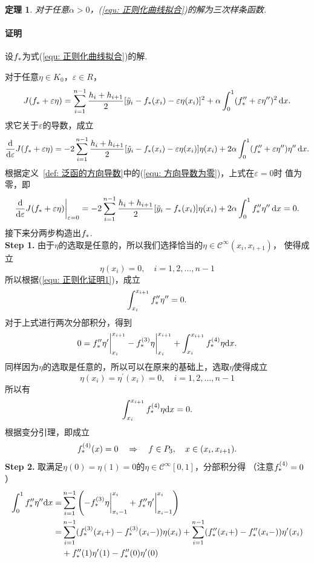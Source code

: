 \documentclass[12pt, a4paper]{article}
\theoremstyle{margin}
\newtheorem{thm}{定理}
\newcommand{\pr}{\prime}
\newcommand{\hp}{^\prime}
\newcommand{\ms}{\mathscr}
\newcommand{\tbf}{\textbf}
\newcommand{\f}{\mathnormal{f}}
\newcommand{\rd}{\mathrm{d}}
\newcommand{\vep}{\varepsilon}
\newcommand\defref[1]{定义~\ref{#1}}
\newcommand\equref[1]{(\ref{#1})}
\newcommand{\proof}{\paragraph{证明}}
\begin{document}
  \begin{thm}
    对于任意$\alpha>0$，\equref{equ: 正则化曲线拟合}的解为三次样条函数.
  \end{thm}
  \proof
    设$\f_*$为式\equref{equ: 正则化曲线拟合}的解. \par
    对于任意$\eta\in K_0$，$\vep\in R$，
    \[
      J(\f_*+\vep\eta) = \sum_{i=1}^{n-1}\frac{h_i + h_{i+1}}{2}
      [\tilde{y}_i - f_*(x_i) - \vep\eta(x_i)]^2 + \alpha
      \int_0^1(\f_*^{\pr\pr} + \vep\eta^{\pr\pr})^2\,\rd x.
    \]
    求它关于$\vep$的导数，成立
    \[
      \frac{\rd}{\rd\vep}J(\f_*+\vep\eta) =
      -2\sum_{i=1}^{n-1}\frac{h_i+h_{i+1}}{2}[\tilde{y}_i-\f_*(x_i)-\vep\eta(x_i)]\eta(x_i)
      +2\alpha\int_0^1 (\f_*^{\pr\pr}+\vep\eta^{\pr\pr})\eta^{\pr\pr} \,\rd x.
    \]
    根据\defref{def: 泛函的方向导数}中的\equref{equ: 方向导数为零}，上式在$\vep=0$时
    值为零，即
    \begin{equation}
      \label{equ: 正则化证明1}
      \frac{\rd}{\rd\vep}J(\f_*+\vep\eta)\bigg|_{\vep=0} =
      -2\sum_{i=1}^{n-1}\frac{h_i+h_{i+1}}{2}[\tilde{y}_i-\f_*(x_i)]\eta(x_i)
      +2\alpha\int_0^1\f_*^{\pr\pr}\eta^{\pr\pr}\,\rd x = 0.
    \end{equation}
    接下来分两步构造出$\f_*$.\\
  \tbf{Step 1. }
    由于$\eta$的选取是任意的，所以我们选择恰当的$\eta\in\ms{C}^\infty(x_i,x_{i+1})$，
    使得成立
    \[
      \eta(x_i) = 0,\quad i = 1,2,\dots,n-1
    \]
    所以根据\equref{equ: 正则化证明1}，成立
    \[
      \int_{x_i}^{x_{i+1}}\f_*^{\pr\pr}\eta^{\pr\pr} = 0.
    \]
    对于上式进行两次分部积分，得到
    \[
      0 = \f_*^{\pr\pr}\eta\hp\bigg|_{x_i}^{x_{i+1}} -
      \f_*^{(3)}\eta\bigg|_{x_i}^{x_{i+1}} +
      \int_{x_i}^{x_{i+1}}\f_*^{(4)}\eta\rd x.
    \]
    同样因为$\eta$的选取是任意的，所以可以在原来的基础上，选取$\eta$使得成立
    \[
      \eta(x_i) = \eta\hp(x_i) = 0,\quad i = 1,2,\dots,n-1
    \]
    所以有
    \[
      \int_{x_i}^{x_{i+1}}\f_*^{(4)}\eta\rd x = 0.
    \]
    根据变分引理，即成立
    \begin{equation}
      \label{equ: 正则化证明2}
      \f_*^{(4)}(x) = 0\quad\Rightarrow\quad \f\in P_3,\quad x\in(x_i,x_{i+1}).
    \end{equation}
  \tbf{Step 2. }
    取满足$\eta(0)=\eta(1)=0$的$\eta\in\ms{C}^\infty[0, 1]$，分部积分得
    （注意$\f_*^{(4)} = 0$）
    \[\begin{split}
      \int_0^1 \f_*^{\pr\pr}\eta^{\pr\pr}\rd x =&
      \sum_{i=1}^{n-1}
      \left(
        -\f_*^{(3)}\eta\bigg|_{x_i-1}^{x_i}
        +\f_*^{\pr\pr}\eta\hp\bigg|_{x_i-1}^{x_i}
      \right) \\
      =& \sum_{i=1}^{n-1}
      ( \f_*^{(3)}(x_i+) - \f_*^{(3)}(x_i-))\eta(x_i) +
      \sum_{i=1}^{n-1} ( \f_*^{\pr\pr}(x_i+) - \f_*^{\pr\pr}(x_i-))\eta\hp(x_i)\\
      & + \f_*^{\pr\pr}(1)\eta\hp(1) - \f_*^{\pr\pr}(0)\eta\hp(0)
    \end{split}\]
\end{document}
